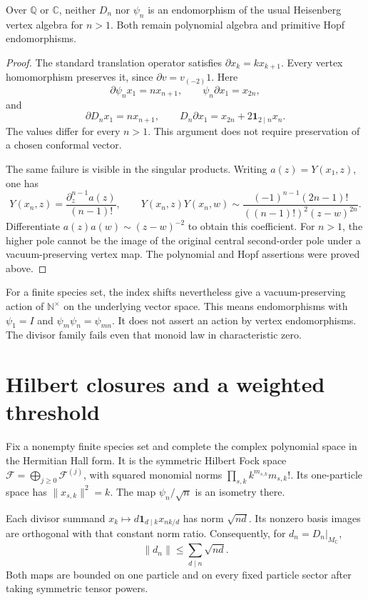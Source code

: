 \begin{proposition}
\label{v4-arith:hecke:prop:vertex}
Over $\mathbb Q$ or $\mathbb C$, neither $D_n$ nor $\psi_n$
is an endomorphism of the usual Heisenberg vertex algebra for $n>1$.
Both remain polynomial algebra and primitive Hopf endomorphisms.
\end{proposition}
\begin{proof}
The standard translation operator satisfies $\partial x_k=kx_{k+1}$.
Every vertex homomorphism preserves it, since
$\partial v=v_{(-2)}1$.
Here
\[
 \partial\psi_nx_1=nx_{n+1},\qquad
 \psi_n\partial x_1=x_{2n},
\]
and
\[
 \partial D_nx_1=nx_{n+1},\qquad
 D_n\partial x_1=x_{2n}+2\mathbf1_{2\mid n}x_n.
\]
The values differ for every $n>1$.
This argument does not require preservation of a chosen conformal vector.

The same failure is visible in the singular products.
Writing $a(z)=Y(x_1,z)$, one has
\[
 Y(x_n,z)=\frac{\partial_z^{n-1}a(z)}{(n-1)!},\qquad
 Y(x_n,z)Y(x_n,w)\sim
 \frac{(-1)^{n-1}(2n-1)!}
 {((n-1)!)^2(z-w)^{2n}}.
\]
Differentiate $a(z)a(w)\sim(z-w)^{-2}$ to obtain this coefficient.
For $n>1$, the higher pole cannot be the image of the original
central second-order pole under a vacuum-preserving vertex map.
The polynomial and Hopf assertions were proved above.
\end{proof}

For a finite species set, the index shifts nevertheless give a
vacuum-preserving action of $\mathbb N^\times$ on the underlying
vector space. This means endomorphisms with $\psi_1=I$ and
$\psi_m\psi_n=\psi_{mn}$.
It does not assert an action by vertex endomorphisms.
The divisor family fails even that monoid law in characteristic zero.

\section{Hilbert closures and a weighted threshold}
\label{v4-arith:hecke:sec:hilbert}

Fix a nonempty finite species set and complete the complex polynomial
space in the Hermitian Hall form.
It is the symmetric Hilbert Fock space
$\mathcal F=\bigoplus_{j\geq0}\mathcal F^{(j)}$,
with squared monomial norms $\prod_{s,k}k^{m_{s,k}}m_{s,k}!$.
Its one-particle space has $\|x_{s,k}\|^2=k$.
The map $\psi_n/\sqrt n$ is an isometry there.

Each divisor summand
$x_k\mapsto d\mathbf1_{d\mid k}x_{nk/d}$ has norm $\sqrt{nd}$.
Its nonzero basis images are orthogonal with that constant norm ratio.
Consequently, for $d_n=D_n|_{M_{\mathbb C}}$,
\[
 \|d_n\|\leq\sum_{d\mid n}\sqrt{nd}.
\]
Both maps are bounded on one particle and on every fixed
particle sector after taking symmetric tensor powers.

